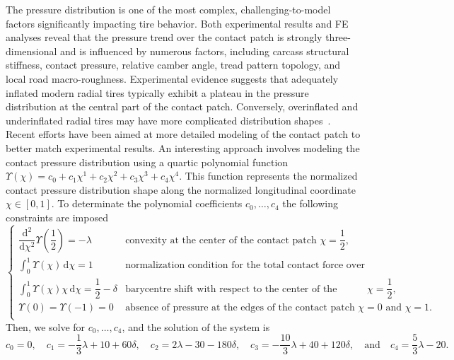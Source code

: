 The pressure distribution is one of the most complex, challenging-to-model factors significantly impacting tire behavior. Both experimental results and \ac{FE} analyses reveal that the pressure trend over the contact patch is strongly three-dimensional and is influenced by numerous factors, including carcass structural stiffness, contact pressure, relative camber angle, tread pattern topology, and local road macro-roughness. Experimental evidence suggests that adequately inflated modern radial tires typically exhibit a plateau in the pressure distribution at the central part of the contact patch. Conversely, overinflated and underinflated radial tires may have more complicated distribution shapes~\cite{nakajima2019advanced, sakai1995measurement}. Recent efforts have been aimed at more detailed modeling of the contact patch to better match experimental results. An interesting approach involves modeling the contact pressure distribution using a quartic polynomial function $\Upsilon(\chi) = c_0 + c_1\chi^1 + c_2\chi^2 + c_3\chi^3 + c_4\chi^4$. This function represents the normalized contact pressure distribution shape along the normalized longitudinal coordinate $\chi \in [0, 1]$. To determinate the polynomial coefficients $c_0, \dots, c_4$ the following constraints are imposed
%
\begin{equation}
  \begin{cases}
    \dfrac{\mathrm{d}^2}{\mathrm{d}\chi^2}\Upsilon\left(\dfrac{1}{2}\right) = -\lambda & \text{convexity at the center of the contact patch $\chi = \dfrac{1}{2}$,}
    \\[1em]
    \displaystyle\int_{0}^{1} \Upsilon(\chi)\,\mathrm{d}\chi = 1 & \text{normalization condition for the total contact force over the contact patch,}
    \\[1em]
    \displaystyle\int_{0}^{1} \Upsilon(\chi)\chi\,\mathrm{d}\chi = \dfrac{1}{2} - \delta & \text{barycentre shift with respect to the center of the contact patch $\chi = \dfrac{1}{2}$,}
    \\[1.5em]
    \Upsilon(0) = \Upsilon(-1) = 0 & \text{absence of pressure at the edges of the contact patch $\chi = 0$ and $\chi = 1$.}
    \\[0.5em]
  \end{cases}
  \label{chap4:eq:upsilon}
\end{equation}
%
Then, we solve for $c_0, \dots, c_4$, and the solution of the system is
%
\begin{equation*}
  c_0 = 0, \quad
  c_1 = -\dfrac{1}{3}\lambda + 10 + 60\delta, \quad
  c_2 = 2\lambda - 30 - 180\delta, \quad
  c_3 = -\dfrac{10}{3}\lambda + 40 + 120\delta, \quad \text{and} \quad
  c_4 = \dfrac{5}{3}\lambda - 20.
\end{equation*}
